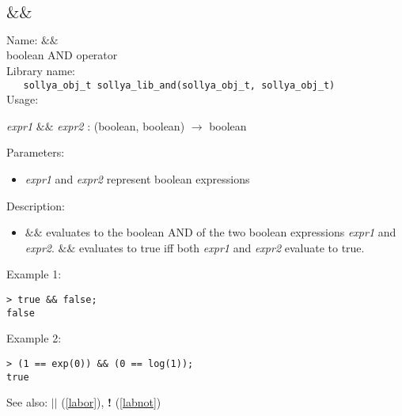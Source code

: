 \subsection{$\&\&$}
\label{laband}
\noindent Name: \textbf{$\&\&$}\\
\phantom{aaa}boolean AND operator\\[0.2cm]
\noindent Library name:\\
\verb|   sollya_obj_t sollya_lib_and(sollya_obj_t, sollya_obj_t)|\\[0.2cm]
\noindent Usage: 
\begin{center}
\emph{expr1} \textbf{$\&\&$} \emph{expr2} : (\textsf{boolean}, \textsf{boolean}) $\rightarrow$ \textsf{boolean}\\
\end{center}
Parameters: 
\begin{itemize}
\item \emph{expr1} and \emph{expr2} represent boolean expressions
\end{itemize}
\noindent Description: \begin{itemize}

\item \textbf{$\&\&$} evaluates to the boolean AND of the two
   boolean expressions \emph{expr1} and \emph{expr2}. \textbf{$\&\&$} evaluates to 
   true iff both \emph{expr1} and \emph{expr2} evaluate to true.
\end{itemize}
\noindent Example 1: 
\begin{center}\begin{minipage}{15cm}\begin{Verbatim}[frame=single]
> true && false;
false
\end{Verbatim}
\end{minipage}\end{center}
\noindent Example 2: 
\begin{center}\begin{minipage}{15cm}\begin{Verbatim}[frame=single]
> (1 == exp(0)) && (0 == log(1));
true
\end{Verbatim}
\end{minipage}\end{center}
See also: \textbf{$||$} (\ref{labor}), \textbf{!} (\ref{labnot})
